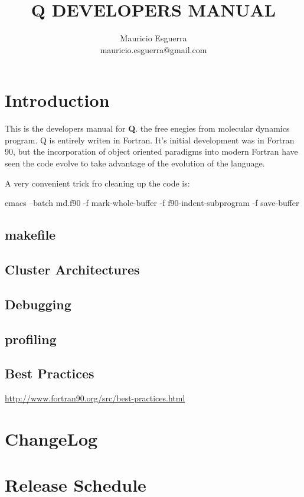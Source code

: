 \documentclass[10pt, oneside, pdftex]{article}
\title{Q DEVELOPERS MANUAL} %
\author{
    Mauricio Esguerra \\
    mauricio.esguerra@gmail.com \\
    \vspace{20pt}
    }
\makeatletter
\def\printtitle{                                        %
{\color{bl} \centering \huge \sc \textbf{\@title}\par}} %
\def\printauthor{                        %
{\centering \small \@author}}            %
\makeatother
\begin{document}
\printtitle
\printauthor
\tableofcontents
%

\section{Introduction}
This is the developers manual for \textbf{Q}. the free enegies from molecular dynamics
program.
Q is entirely writen in Fortran. It's initial development was in Fortran 90, but
the incorporation of object oriented paradigms into modern Fortran have seen
the code evolve to take advantage of the evolution of the language.

A very convenient trick fro cleaning up the code is:

emacs --batch md.f90 -f mark-whole-buffer -f f90-indent-subprogram -f save-buffer

\label{makefile}
\subsection{makefile}

\label{clusterarchitectures}
\subsection{Cluster Architectures}

\label{debugging}
\subsection{Debugging}

\label{profiling}
\subsection{profiling}

\label{bestpractices}
\subsection{Best Practices}

\url{http://www.fortran90.org/src/best-practices.html}

\label{changelog}
\section{ChangeLog}

\label{schedule}
\section{Release Schedule}
\end{document}
